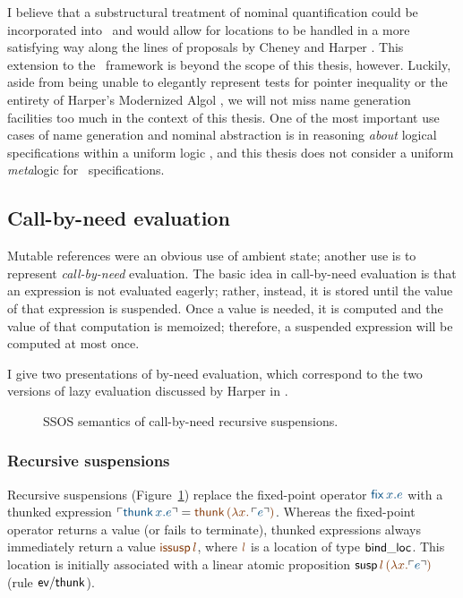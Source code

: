 I believe that a substructural treatment of nominal quantification
could be incorporated into \sls~and would allow for locations to be
handled in a more satisfying way along the lines of proposals by
Cheney and Harper \cite{cheney12dependent,harper12practical}. This
extension to the \sls~framework is beyond the scope of this thesis,
however. Luckily, aside from being unable to elegantly represent tests
for pointer inequality or the entirety of Harper's Modernized Algol
\cite[Chapter 35]{harper12practical}, we will not miss name generation
facilities too much in the context of this thesis. One of the most important
use cases of name generation and nominal abstraction is in reasoning
{\it about} logical specifications within a uniform logic
\cite{gacek11nominal}, and this thesis does not consider a uniform {\it
  meta}logic for \sls~specifications.

\subsection{Call-by-need evaluation}
\label{sec:call-by-need}

Mutable references were
an obvious use of ambient state; another use is to
represent {\it call-by-need} evaluation. The basic idea in
call-by-need evaluation is that an expression is not evaluated
eagerly; rather, instead, it is stored until the value of that
expression is suspended. Once a value is
needed, it is computed and the value of that computation is memoized;
therefore, a suspended expression will be computed at most once.

I give two presentations of by-need evaluation, which correspond to
the two versions of lazy evaluation discussed by Harper in
\cite[Chapter 37]{harper12practical}.



\begin{figure}[t]
\caption{SSOS semantics of call-by-need recursive suspensions.}
\label{fig:ssos-cbneed}
\end{figure}

\subsubsection{Recursive suspensions}


Recursive suspensions (Figure~\ref{fig:ssos-cbneed}) replace the
fixed-point operator $\obj{{\sf fix}\,x.e}$ with a thunked expression
$\interp{{\sf thunk}\,x.e} = \lf{{\sf thunk}\,(\lambda
x.\,\interp{e})}$. Whereas the fixed-point operator returns a value (or
fails to terminate), thunked expressions always immediately return a
value $\lf{{\sf issusp}\,l}$, where $\lf{l}$ is a location of type ${\sf
  bind\_loc}$. This location is initially associated with a linear
atomic proposition ${\sf susp}\,\lf{l}\,\lf{(\lambda x.\interp{e})}$ 
(rule ${\sf
  ev/thunk}$).

